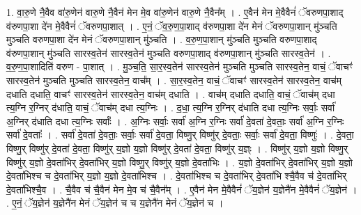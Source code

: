 \documentclass[17pt]{extarticle}
\begin{document}
1. वा॒रु॒णे नै॒वैव वा॑रु॒णेन॑ वारु॒णे नै॒वैन॑ मेन मे॒व वा॑रु॒णेन॑ वारु॒णे नै॒वैन᳚म् । . ए॒वैन॑ मेन मे॒वैवैनं॑ ॅवरुणपा॒शाद् व॑रुणपा॒शा दे॑न मे॒वैवैनं॑ ॅवरुणपा॒शात् । . ए॒नं॒ ॅव॒रु॒ण॒पा॒शाद् व॑रुणपा॒शा दे॑न मेनं ॅवरुणपा॒शान् मु॑ञ्चति मुञ्चति वरुणपा॒शा दे॑न मेनं ॅवरुणपा॒शान् मु॑ञ्चति । . व॒रु॒ण॒पा॒शान् मु॑ञ्चति मुञ्चति वरुणपा॒शाद् व॑रुणपा॒शान् मु॑ञ्चति सारस्व॒तेन॑ सारस्व॒तेन॑ मुञ्चति वरुणपा॒शाद् व॑रुणपा॒शान् मु॑ञ्चति सारस्व॒तेन॑ । . व॒रु॒ण॒पा॒शादिति॑ वरुण - पा॒शात् । . मु॒ञ्च॒ति॒ सा॒र॒स्व॒तेन॑ सारस्व॒तेन॑ मुञ्चति मुञ्चति सारस्व॒तेन॒ वाचं॒ ॅवाचꣳ॑ सारस्व॒तेन॑ मुञ्चति मुञ्चति सारस्व॒तेन॒ वाच᳚म् । . सा॒र॒स्व॒तेन॒ वाचं॒ ॅवाचꣳ॑ सारस्व॒तेन॑ सारस्व॒तेन॒ वाच॑म् दधाति दधाति॒ वाचꣳ॑ सारस्व॒तेन॑ सारस्व॒तेन॒ वाच॑म् दधाति । . वाच॑म् दधाति दधाति॒ वाचं॒ ॅवाच॑म् दधा त्य॒ग्नि र॒ग्निर् द॑धाति॒ वाचं॒ ॅवाच॑म् दधा त्य॒ग्निः । . द॒धा॒ त्य॒ग्नि र॒ग्निर् द॑धाति दधा त्य॒ग्निः सर्वाः॒ सर्वा॑ अ॒ग्निर् द॑धाति दधा त्य॒ग्निः सर्वाः᳚ । . अ॒ग्निः सर्वाः॒ सर्वा॑ अ॒ग्नि र॒ग्निः सर्वा॑ दे॒वता॑ दे॒वताः॒ सर्वा॑ अ॒ग्नि र॒ग्निः सर्वा॑ दे॒वताः᳚ । . सर्वा॑ दे॒वता॑ दे॒वताः॒ सर्वाः॒ सर्वा॑ दे॒वता॒ विष्णु॒र् विष्णु॑र् दे॒वताः॒ सर्वाः॒ सर्वा॑ दे॒वता॒ विष्णुः॑ । . दे॒वता॒ विष्णु॒र् विष्णु॑र् दे॒वता॑ दे॒वता॒ विष्णु॑र् य॒ज्ञो य॒ज्ञो विष्णु॑र् दे॒वता॑ दे॒वता॒ विष्णु॑र् य॒ज्ञ्ः । . विष्णु॑र् य॒ज्ञो य॒ज्ञो विष्णु॒र् विष्णु॑र् य॒ज्ञो दे॒वता॑भिर् दे॒वता॑भिर् य॒ज्ञो विष्णु॒र् विष्णु॑र् य॒ज्ञो दे॒वता॑भिः । . य॒ज्ञो दे॒वता॑भिर् दे॒वता॑भिर् य॒ज्ञो य॒ज्ञो दे॒वता॑भिश्च च दे॒वता॑भिर् य॒ज्ञो य॒ज्ञो दे॒वता॑भिश्च । . दे॒वता॑भिश्च च दे॒वता॑भिर् दे॒वता॑भि श्चै॒वैव च॑ दे॒वता॑भिर् दे॒वता॑भिश्चै॒व । . चै॒वैव च॑ चै॒वैन॑ मेन मे॒व च॑ चै॒वैन᳚म् । . ए॒वैन॑ मेन मे॒वैवैनं॑ ॅय॒ज्ञेन॑ य॒ज्ञेनै॑न मे॒वैवैनं॑ ॅय॒ज्ञेन॑ । . ए॒नं॒ ॅय॒ज्ञेन॑ य॒ज्ञेनै॑न मेनं ॅय॒ज्ञेन॑ च च य॒ज्ञेनै॑न मेनं ॅय॒ज्ञेन॑ च । \newline
\end{document}
